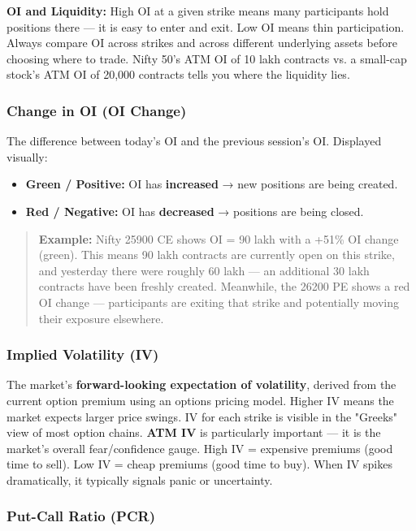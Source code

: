 \documentclass[12pt,openany]{book}
\begin{document}
\textbf{OI and Liquidity:} High OI at a given strike means many participants hold positions there — it is easy to enter and exit. Low OI means thin participation. Always compare OI across strikes and across different underlying assets before choosing where to trade. Nifty 50's ATM OI of 10 lakh contracts vs. a small-cap stock's ATM OI of 20,000 contracts tells you where the liquidity lies.

\subsubsection{Change in OI (OI Change)}

The difference between today's OI and the previous session's OI. Displayed visually:
\begin{itemize}[leftmargin=*]
    \item \textbf{Green / Positive:} OI has \textbf{increased} → new positions are being created.
    \item \textbf{Red / Negative:} OI has \textbf{decreased} → positions are being closed.
\end{itemize}

\begin{quote}
\textbf{Example:} Nifty 25900 CE shows OI = 90 lakh with a +51\% OI change (green). This means 90 lakh contracts are currently open on this strike, and yesterday there were roughly 60 lakh — an additional 30 lakh contracts have been freshly created. Meanwhile, the 26200 PE shows a red OI change — participants are exiting that strike and potentially moving their exposure elsewhere.
\end{quote}

\subsubsection{Implied Volatility (IV)}

The market's \textbf{forward-looking expectation of volatility}, derived from the current option premium using an options pricing model. Higher IV means the market expects larger price swings. IV for each strike is visible in the "Greeks" view of most option chains. \textbf{ATM IV} is particularly important — it is the market's overall fear/confidence gauge. High IV = expensive premiums (good time to sell). Low IV = cheap premiums (good time to buy). When IV spikes dramatically, it typically signals panic or uncertainty.

\subsubsection{Put-Call Ratio (PCR)}
\end{document}
